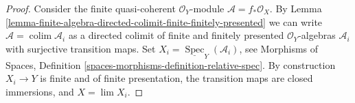\documentclass{stacks-project}
\theoremstyle{plain}
\theoremstyle{definition}
\theoremstyle{remark}
\numberwithin{equation}{subsection}
\def\lim{\mathop{\mathrm{lim}}\nolimits}
\def\colim{\mathop{\mathrm{colim}}\nolimits}
\def\Spec{\mathop{\mathrm{Spec}}}
\begin{document}
\begin{proof}
Consider the finite quasi-coherent $\mathcal{O}_Y$-module
$\mathcal{A} = f_*\mathcal{O}_X$. By
Lemma \ref{lemma-finite-algebra-directed-colimit-finite-finitely-presented}
we can write $\mathcal{A} = \colim \mathcal{A}_i$ as a directed
colimit of finite and finitely presented $\mathcal{O}_Y$-algebras
$\mathcal{A}_i$ with surjective transition maps.
Set $X_i = \underline{\Spec}_Y(\mathcal{A}_i)$, see
Morphisms of Spaces, Definition
\ref{spaces-morphisms-definition-relative-spec}.
By construction $X_i \to Y$ is finite and of finite presentation,
the transition maps are closed immersions, and $X = \lim X_i$.
\end{proof}
\end{document}
